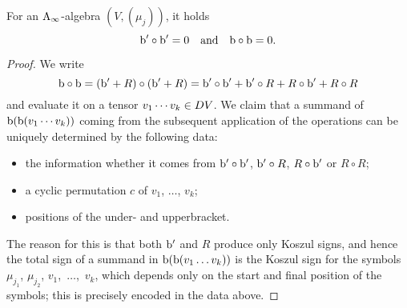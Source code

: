 \documentclass[\MainFolder/Text.tex]{subfiles}
\begin{document}
\begin{Lemma}[CP1] \label{Lem:CP1}
For an $\mathrm{A}_\infty$-algebra $(V,(\mu_j))$, it holds
$$ \mathrm{b}'\circ \mathrm{b}' = 0\quad\text{and}\quad \mathrm{b} \circ \mathrm{b} = 0. $$
\end{Lemma}
\begin{proof}
We write
$$ \mathrm{b}\circ\mathrm{b}  = (\mathrm{b}' + R)\circ(\mathrm{b}' + R) = \mathrm{b}'\circ \mathrm{b}' + \mathrm{b}' \circ R + R \circ \mathrm{b}' + R \circ R $$
and evaluate it on a tensor $v_1\dotsb v_k \in D V$. We claim that a summand of $\mathrm{b}(\mathrm{b}(v_1\dotsb v_k))$ coming from the subsequent application of the operations can be uniquely determined by the following data: 
\begin{itemize}
\item the information whether it comes from $\mathrm{b}'\circ \mathrm{b}'$, $\mathrm{b}'\circ R$, $R\circ \mathrm{b}'$ or $R\circ R$;
\item a cyclic permutation $c$ of $v_1$, $\dotsc$, $v_k$;
\item positions of the under- and upperbracket.
\end{itemize}
The reason for this is that both $\mathrm{b}'$ and $R$ produce only Koszul signs, and hence the total sign of a summand in $\mathrm{b}(\mathrm{b}(v_1\dots v_k))$ is the Koszul sign for the symbols $\mu_{j_1}$, $\mu_{j_2}$, $v_1$,~$\dotsc$,~$v_k$, which depends only on the start and final position of the symbols; this is precisely encoded in the data above.


\end{proof}
\end{document}
